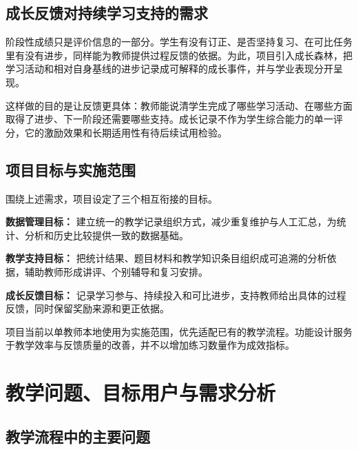 \documentclass[11pt,a4paper,fontset=none]{ctexart}
\begin{document}
\subsection{成长反馈对持续学习支持的需求}

阶段性成绩只是评价信息的一部分。学生有没有订正、是否坚持复习、在可比任务里有没有进步，同样能为教师提供过程反馈的依据。为此，项目引入成长森林，把学习活动和相对自身基线的进步记录成可解释的成长事件，并与学业表现分开呈现。

这样做的目的是让反馈更具体：教师能说清学生完成了哪些学习活动、在哪些方面取得了进步、下一阶段还需要哪些支持。成长记录不作为学生综合能力的单一评分，它的激励效果和长期适用性有待后续试用检验。

\subsection{项目目标与实施范围}

围绕上述需求，项目设定了三个相互衔接的目标。

\textbf{数据管理目标：} 建立统一的教学记录组织方式，减少重复维护与人工汇总，为统计、分析和历史比较提供一致的数据基础。

\textbf{教学支持目标：} 把统计结果、题目材料和教学知识条目组织成可追溯的分析依据，辅助教师形成讲评、个别辅导和复习安排。

\textbf{成长反馈目标：} 记录学习参与、持续投入和可比进步，支持教师给出具体的过程反馈，同时保留奖励来源和更正依据。

项目当前以单教师本地使用为实施范围，优先适配已有的教学流程。功能设计服务于教学效率与反馈质量的改善，并不以增加练习数量作为成效指标。

\section{教学问题、目标用户与需求分析}

\subsection{教学流程中的主要问题}
\end{document}
